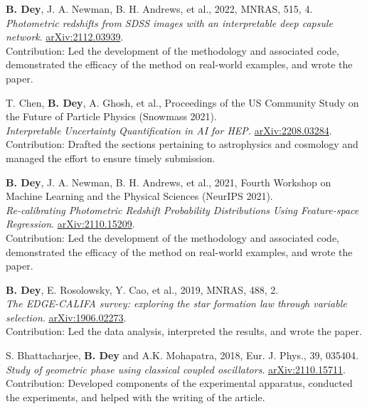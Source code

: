 \begin{etaremune}[leftmargin=40pt,labelsep=10pt]
    \item \textbf{B. Dey}, J. A. Newman, B. H. Andrews, et al., 2022, MNRAS, 515, 4.\\ \textrm{\textit{Photometric redshifts from SDSS images with an interpretable deep capsule network}}. \href{https://arxiv.org/abs/2112.03939}{arXiv:2112.03939}.
     \\ Contribution: Led the development of the methodology and associated code, demonstrated the efficacy of the method on real-world examples, and wrote the paper.
    
    \item T. Chen, \textbf{B. Dey}, A. Ghosh, et al., Proceedings of the US Community Study on the Future of Particle Physics (Snowmass 2021).\\ \textrm{\textit{Interpretable Uncertainty Quantification in AI for HEP.}} \href{https://arxiv.org/abs/2208.03284}{arXiv:2208.03284}.
     \\ Contribution: Drafted the sections pertaining to astrophysics and cosmology and managed the effort to ensure timely submission. 
    
    \item \textbf{B. Dey}, J. A. Newman, B. H. Andrews, et al., 2021, Fourth Workshop on Machine Learning and the Physical Sciences (NeurIPS 2021).\\ \textrm{\textit{Re-calibrating Photometric Redshift Probability Distributions Using Feature-space Regression}}. \href{https://arxiv.org/abs/2110.15209}{arXiv:2110.15209}.
    \\ Contribution: Led the development of the methodology and associated code, demonstrated the efficacy of the method on real-world examples, and wrote the paper.
    
    \item \textbf{B. Dey}, E. Rosolowsky, Y. Cao, et al., 2019, MNRAS, 488, 2.\\ \textrm{\textit{The EDGE-CALIFA survey: exploring the star formation law through variable selection}}. \href{https://arxiv.org/abs/1906.02273}{arXiv:1906.02273}.
    \\ Contribution: Led the data analysis, interpreted the results, and wrote the paper. 
    
    \item S. Bhattacharjee, \textbf{B. Dey} and A.K. Mohapatra, 2018, Eur. J. Phys., 39, 035404.\\ \textrm{\textit{Study of geometric phase using classical coupled oscillators}}. \href{https://arxiv.org/abs/2110.15711}{arXiv:2110.15711}.
    \\ Contribution: Developed components of the experimental apparatus, conducted the experiments, and helped with the writing of the article.
\end{etaremune}
 

